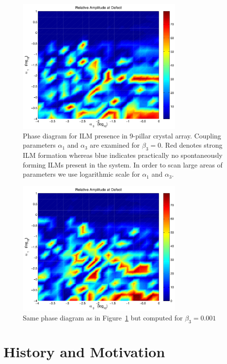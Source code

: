 \documentclass[12pt]{report}
\begin{document}
\begin{figure}[t]
\begin{center}
\includegraphics[width = 83mm]{../diagrams/alpha13beta0.pdf}
\caption{Phase diagram for ILM presence in 9-pillar crystal array.  Coupling parameters $\alpha_1$ and $\alpha_3$ are examined for  $\beta_3=0$. Red denotes strong ILM formation whereas blue indicates practically no spontaneously forming ILMs present in the system. In order to scan large areas of parameters we use logarithmic scale for $\alpha_1$ and $\alpha_3$. }
\label{fig:phase1}
\end{center}
\end{figure}

\begin{figure}[t]
\begin{center}
\includegraphics[width = 83mm]{../diagrams/alpha13beta3small.pdf}
\caption{Same phase diagram as in Figure~\ref{fig:phase1} but computed for $\beta_3=0.001$}
\label{fig:phase2}
\end{center}
\end{figure}



\section{History and Motivation}
\end{document}
